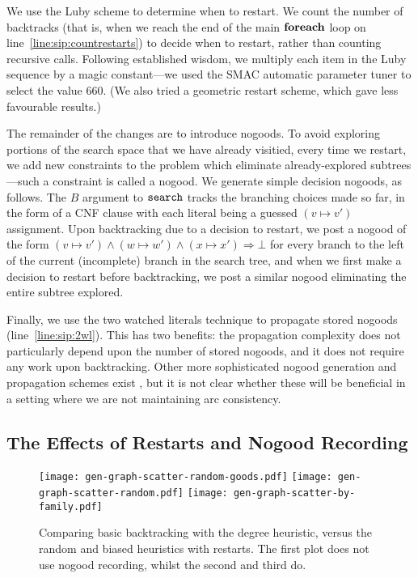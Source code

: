 \documentclass[letterpaper]{article} %
\newcommand{\siplineref}[1]{line~\ref{line:sip:#1}}
\begin{document}
We use the Luby scheme \cite{DBLP:journals/ipl/LubySZ93} to determine when to restart. We count the
number of backtracks (that is, when we reach the end of the main $\KwSty{foreach}$ loop on
\siplineref{countrestarts}) to decide when to restart, rather than counting recursive calls.
Following established wisdom, we multiply each item in the Luby sequence by a magic constant---we
used the SMAC automatic parameter tuner \cite{DBLP:conf/lion/HutterHL11} to select the value 660.
(We also tried a geometric restart scheme, which gave less favourable results.)

The remainder of the changes are to introduce nogoods. To avoid exploring portions of the search
space that we have already visitied, every time we restart, we add new constraints to the problem
which eliminate already-explored subtrees---such a constraint is called a nogood. We generate simple
decision nogoods, as follows. The $B$ argument to $\FuncSty{search}$ tracks the branching choices
made so far, in the form of a CNF clause with each literal being a guessed $(v \mapsto v')$
assignment. Upon backtracking due to a decision to restart, we post a nogood of the form $(v \mapsto
v') \wedge (w \mapsto w') \wedge (x \mapsto x') \Rightarrow \bot$ for every branch to the left of
the current (incomplete) branch in the search tree, and when we first make a decision to restart
before backtracking, we post a similar nogood eliminating the entire subtree explored.

Finally, we use the two watched literals technique \cite{DBLP:conf/dac/MoskewiczMZZM01} to
propagate stored nogoods (\siplineref{2wl}). This has two benefits: the propagation complexity does
not particularly depend upon the number of stored nogoods, and it does not require any work upon
backtracking.  Other more sophisticated nogood generation and propagation schemes exist
\cite{DBLP:conf/aaai/LeeSZ16,DBLP:conf/cp/GlorianBLLM17}, but it is not clear whether these will be
beneficial in a setting where we are not maintaining arc consistency.

\subsection{The Effects of Restarts and Nogood Recording}

\begin{figure*}[tb]
    \texttt{[image: gen-graph-scatter-random-goods.pdf]}
    \hfill
    \texttt{[image: gen-graph-scatter-random.pdf]}
    \hfill
    \texttt{[image: gen-graph-scatter-by-family.pdf]}
    \caption{Comparing basic backtracking with the degree heuristic, versus the random and biased
    heuristics with restarts. The first plot does not use nogood recording, whilst the second and
    third do.}
    \label{figure:scatter-random}
\end{figure*}
\end{document}
